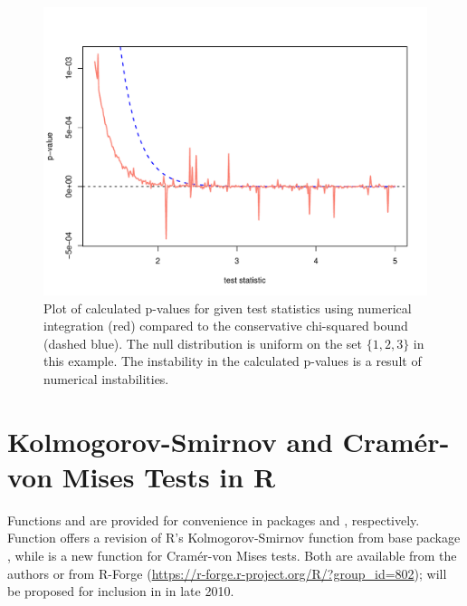 \begin{figure}
\begin{center}
\includegraphics[scale=0.4]{fig1.pdf}
\end{center}
\caption{Plot of calculated p-values for given test statistics
using numerical integration
(red) compared to the conservative chi-squared bound (dashed blue). 
The null distribution is uniform on the set $\{1,2,3\}$ in this example.
The instability in the calculated p-values is a result of numerical
instabilities.}
\label{cvmissues}
\end{figure}


\section{Kolmogorov-Smirnov and Cram\'{e}r-von Mises Tests in R}

Functions  and  are provided for
convenience in packages  and , respectively.
Function  offers a revision of
R's Kolmogorov-Smirnov function  from base
package , while  is a new
function for Cram\'{e}r-von Mises tests.
Both are available from the authors
or from R-Forge (\url{https://r-forge.r-project.org/R/?group_id=802});
 will be proposed for inclusion in  in late 2010.


